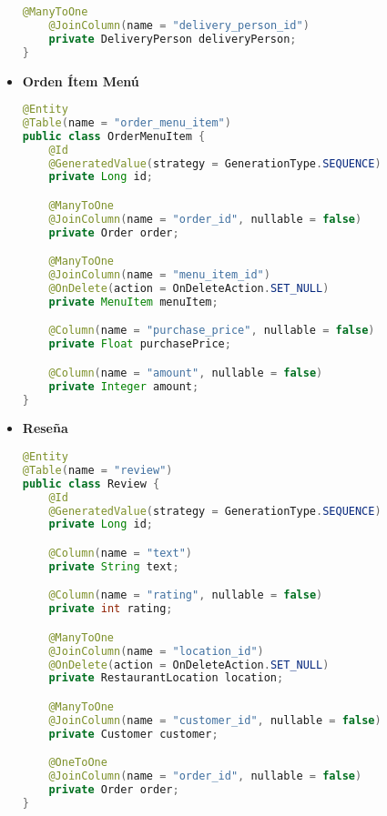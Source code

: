 \begin{itemize}
\begin{lstlisting}[style=common, language=Java]
    @ManyToOne
    @JoinColumn(name = "delivery_person_id")
    private DeliveryPerson deliveryPerson;
}
\end{lstlisting}


\item \textbf{Orden Ítem Menú}

\begin{lstlisting}[style=common, language=Java]
@Entity
@Table(name = "order_menu_item")
public class OrderMenuItem {
    @Id
    @GeneratedValue(strategy = GenerationType.SEQUENCE)
    private Long id;

    @ManyToOne
    @JoinColumn(name = "order_id", nullable = false)
    private Order order;

    @ManyToOne
    @JoinColumn(name = "menu_item_id")
    @OnDelete(action = OnDeleteAction.SET_NULL)
    private MenuItem menuItem;

    @Column(name = "purchase_price", nullable = false)
    private Float purchasePrice;

    @Column(name = "amount", nullable = false)
    private Integer amount;
}
\end{lstlisting}


\item \textbf{Reseña}

\begin{lstlisting}[style=common, language=Java]
@Entity
@Table(name = "review")
public class Review {
    @Id
    @GeneratedValue(strategy = GenerationType.SEQUENCE)
    private Long id;

    @Column(name = "text")
    private String text;

    @Column(name = "rating", nullable = false)
    private int rating;

    @ManyToOne
    @JoinColumn(name = "location_id")
    @OnDelete(action = OnDeleteAction.SET_NULL)
    private RestaurantLocation location;

    @ManyToOne
    @JoinColumn(name = "customer_id", nullable = false)
    private Customer customer;

    @OneToOne
    @JoinColumn(name = "order_id", nullable = false)
    private Order order;
}
\end{lstlisting}

\end{itemize}
